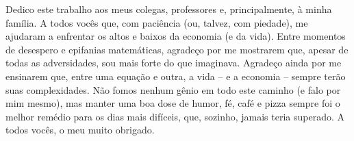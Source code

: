 \begin{dedicatoria}
   \vspace*{\fill}

{%
	\noindent\hspace{.5\textwidth}
	{\begin{minipage}{.5\textwidth}
			\begin{flushleft}
				Dedico este trabalho aos meus colegas, professores e, principalmente, à minha família. A todos vocês que, com paciência (ou, talvez, com piedade), me ajudaram a enfrentar os altos e baixos da economia (e da vida). Entre momentos de desespero e epifanias matemáticas, agradeço por me mostrarem que, apesar de todas as adversidades, sou mais forte do que imaginava. Agradeço ainda por me ensinarem que, entre uma equação e outra, a vida – e a economia – sempre terão suas complexidades. Não fomos nenhum gênio em todo este caminho (e falo por mim mesmo), mas manter uma boa dose de humor, fé, café e pizza sempre foi o melhor remédio para os dias mais difíceis, que, sozinho, jamais teria superado. A todos vocês, o meu muito obrigado.
			\end{flushleft}
	\end{minipage}}%
\vspace*{3cm}
}%

\end{dedicatoria}
